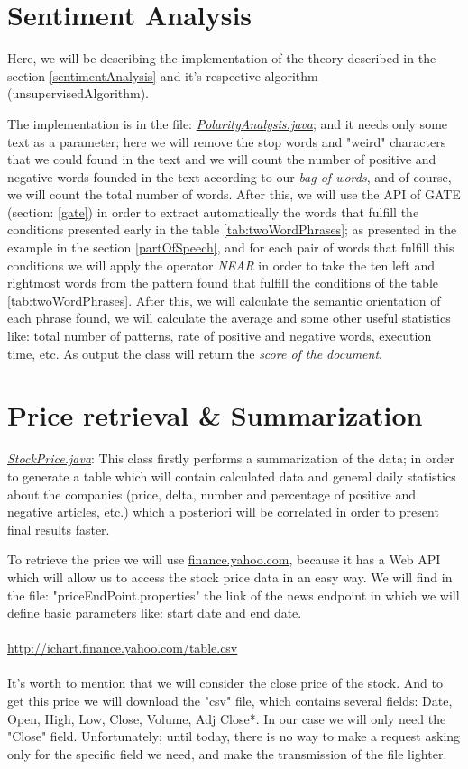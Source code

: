 \section{Sentiment Analysis}

Here, we will be describing the implementation of the theory described in the section \ref{sentimentAnalysis} and it's respective algorithm ({unsupervisedAlgorithm}).

The implementation is in the file: \emph{\ul{PolarityAnalysis.java}}; and it needs only some text as a parameter; here we will remove the stop words and "weird" characters that we could found in the text and we will count the number of positive and negative words founded in the text according to our \emph{bag of words}, and of course, we will count the total number of words. After this, we will use the API of GATE (section: \ref{gate}) in order to extract automatically the words that fulfill the conditions presented early in the table \ref{tab:twoWordPhrases}; as presented in the example in the section \ref{partOfSpeech}, and for each pair of words that fulfill this conditions we will apply the operator \emph{NEAR} in order to take the ten left and rightmost words from the pattern found that fulfill the conditions of the table \ref{tab:twoWordPhrases}. After this, we will calculate the semantic orientation of each phrase found, we will calculate the average and some other useful statistics like: total number of patterns, rate of positive and negative words, execution time, etc. As output the class will return the \emph{score of the document}.

\section{Price retrieval \& Summarization}\label{priceRetrieval}

\emph{\ul{StockPrice.java}}: This class firstly performs a summarization of the data; in order to generate a table which will contain calculated data and general daily statistics about the companies (price, delta, number and percentage of positive and negative articles, etc.) which a posteriori will be correlated in order to present final results faster.

To retrieve the price we will use \url{finance.yahoo.com}, because it has a \gls{Web API} which will allow us to access the stock price data in an easy way. We will find in the file: "priceEndPoint.properties" the link of the \gls{news endpoint} in which we will define basic parameters like: start date and end date.
\\\\
\url{http://ichart.finance.yahoo.com/table.csv} 
\\\\
It's worth to mention that we will consider the close price of the stock. And to get this price we will download the "csv" file, which contains several fields: Date, Open, High, Low, Close, Volume, Adj Close*. In our case we will only need the "Close" field. Unfortunately; until today, there is no way to make a request asking only for the specific field we need, and make the transmission of the file lighter.

